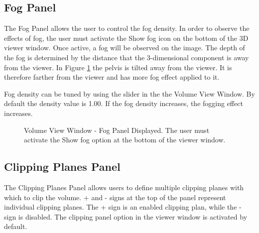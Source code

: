 \documentclass[fleqn,11pt,openany]{book}
\begin{document}
\subsection{Fog Panel}



The Fog Panel allows the user to control the fog density.  
In order to observe the effects of fog, the user must activate the Show fog icon on the bottom of the 3D viewer window.
Once active, a fog will be observed on the image.  
The depth of the fog is determined by the distance that the 3-dimensional component is away from the viewer.   
In Figure \ref{fig:FogPanel} the pelvis is tilted away from the viewer.
It is therefore farther from the viewer and has more fog effect applied to it.

Fog density can be tuned by using the slider in the the Volume View Window.  
By default the density value is 1.00.
If the fog density increases, the fogging effect increases.
\begin{figure}[t]
\caption{Volume View Window - Fog Panel Displayed. The user must activate the Show fog option at the bottom of the viewer window.}\label{fig:FogPanel}
\end{figure}

\subsection{Clipping Planes Panel}
The Clipping Planes Panel allows users to define multiple clipping planes with which to clip the volume.  
+ and - signs at the top of the panel represent individual clipping planes.  
The + sign is an enabled clipping plan, while the - sign is disabled.
The clipping panel option in the viewer window is activated by default.
\end{document}

